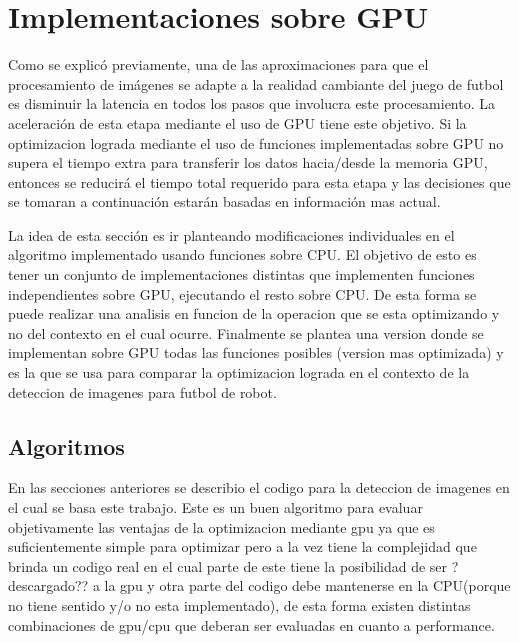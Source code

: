\documentclass[a4paper,10pt]{report}
\begin{document}
\section{Implementaciones sobre GPU}
Como se explicó previamente, una de las aproximaciones para que el procesamiento de imágenes se adapte a la realidad cambiante del juego de futbol es disminuir la latencia en todos los pasos que involucra este procesamiento.
La aceleración de esta etapa mediante el uso de GPU tiene este objetivo. 
Si la optimizacion lograda mediante el uso de funciones implementadas sobre GPU no supera el tiempo extra para transferir los datos hacia/desde la memoria GPU, entonces se reducirá el tiempo total requerido para esta etapa y las decisiones que se tomaran a continuación estarán basadas en información mas actual.

La idea de esta sección es ir planteando modificaciones individuales en el algoritmo implementado usando funciones sobre CPU.
El objetivo de esto es tener un conjunto de implementaciones distintas que implementen funciones independientes sobre GPU, ejecutando el resto sobre CPU.
De esta forma se puede realizar una analisis en funcion de la operacion que se esta optimizando y no del contexto en el cual ocurre.
Finalmente se plantea una version donde se implementan sobre GPU todas las funciones posibles (version mas optimizada) y es la que se usa para comparar la optimizacion lograda en el contexto de la deteccion de imagenes para futbol de robot.





\subsection{Algoritmos}



En las secciones anteriores se describio el codigo para la deteccion de imagenes en el cual se basa este trabajo. 
Este es un buen algoritmo para evaluar objetivamente las ventajas de la optimizacion mediante gpu ya que es suficientemente simple para optimizar pero a la vez tiene la complejidad que brinda un 
codigo real en el cual parte de este tiene la posibilidad de ser ?descargado?? a la gpu y otra parte del codigo debe mantenerse en la CPU(porque no tiene sentido y/o no esta implementado),
de esta forma existen distintas combinaciones de gpu/cpu que deberan ser evaluadas en cuanto a performance.
\end{document}
